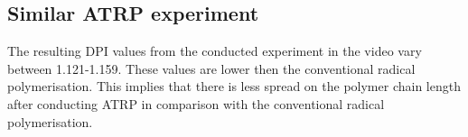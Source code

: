 \subsection{Similar ATRP experiment}

    The resulting DPI values from the conducted experiment in the video vary between 1.121-1.159. 
    These values are lower then the conventional radical polymerisation. This implies that there is
    less spread on the polymer chain length after conducting ATRP in comparison with the conventional
    radical polymerisation.